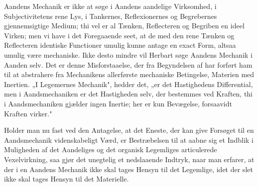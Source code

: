 \documentclass[12pt]{book}
\newcommand{\opage}[1]{\marginnote{\footnotesize\textit{[#1]}}}
\begin{document}
Aandens Mechanik er ikke at søge i Aandens aandelige Virksomhed, i Subjectivitetens rene Lys, i
Tankernes, Reflexionernes og Begrebernes gjennemsigtige Medium; thi vel er al Tænken, Reflecteren og
Begriben en ideel Virken; men vi have i det Foregaaende seet, at de med den rene Tænken og
Reflecteren identiske Functioner umulig kunne antage en exact Form, altsaa umulig være mechaniske.
Ikke desto mindre vil Herbart søge Aandens Mechanik i Aanden selv. Det er denne Misforstaaelse, der
fra Begyndelsen af har forført ham til at abstrahere fra Mechanikens allerførste mechaniske
Betingelse, Materien med Inertien. „I Legemernes Mechanik", hedder det, „er det Hastighedens
Differential, men i Aandsmechaniken er det Hastigheden selv, der bestemmes ved Kraften, thi i
Aandsmechaniken gjælder ingen Inertie; her er kun Bevægelse, forsaavidt Kraften virker."

Holder man nu fast ved den Antagelse, at det Eneste, der kan give Forsøget til en Aandsmechanik
videnskabeligt Værd, er Bestræbelsen til at aabne sig et Indblik i Muligheden af det Aandeliges og
det organisk Legemliges articulerede Vexelvirkning, saa gjør det unegtelig et nedslaaende Indtryk,
naar man erfarer, at der i en Aandens Mechanik ikke skal
\opage{420} tages Hensyn til det Legemlige, idet der slet ikke skal tages Hensyn til det Materielle.
\end{document}

